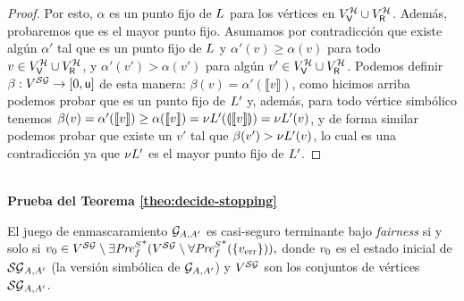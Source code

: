 \begin{proof}
    Por esto, $\alpha$ es un punto fijo de $L$ para los vértices en $V^{\mathcal{H}}_{\mathsf{V}} \cup V^{\mathcal{H}}_{\mathsf{R}}$.  Además,  probaremos que es el mayor punto fijo. Asumamos por contradicción que existe algún $\alpha'$ tal que es un punto fijo de $L$ y $\alpha'(v) \geq  \alpha(v)$ para todo $v \in V^{\mathcal{H}}_{\mathsf{V}} \cup V^{\mathcal{H}}_{\mathsf{R}}$, y $\alpha'(v') >  \alpha(v')$ para algún $v' \in V^{\mathcal{H}}_{\mathsf{V}} \cup V^{\mathcal{H}}_{\mathsf{R}}$.  
    Podemos definir $\beta : V^{\mathcal{SG}} \rightarrow [0,\mathsf{u}]$ de esta manera: $\beta(v) = \alpha'(\llbracket v \rrbracket)$, como hicimos arriba podemos probar que es un punto fijo de $L'$ y, además, para todo vértice simbólico tenemos $\beta(v) =  \alpha'(\llbracket v \rrbracket) \geq \alpha(\llbracket v \rrbracket) = \nu L'(\llparenthesis \llbracket v \rrbracket \rrparenthesis)
    = \nu L'(v)$, y de forma similar podemos probar que existe un $v'$ tal que $\beta(v') >  \nu L'(v)$, lo cual es una contradicción ya que $\nu L'$ es el mayor punto fijo de $L'$.
\end{proof}\\





















\noindent
\textbf{Prueba del Teorema \ref{theo:decide-stopping}}

El juego de enmascaramiento 
 $\mathcal{G}_{A,A'}$ es casi-seguro terminante bajo \emph{fairness}  si y solo si
$
  v_0 \in V^{\mathcal{SG}} \setminus {\exists\mathit{Pre}^S_f}^*(V^{\mathcal{SG}} \setminus {\forall\mathit{Pre}^S_f}^*(\{ v_{\text{err}} \})),
$
donde $v_0$ es el estado inicial de $\mathcal{SG}_{A,A'}$ (la versión simbólica de $\mathcal{G}_{A,A'}$) y $V^{\mathcal{SG}}$ son los conjuntos de vértices $\mathcal{SG}_{A,A'}$.
\noindent \\

